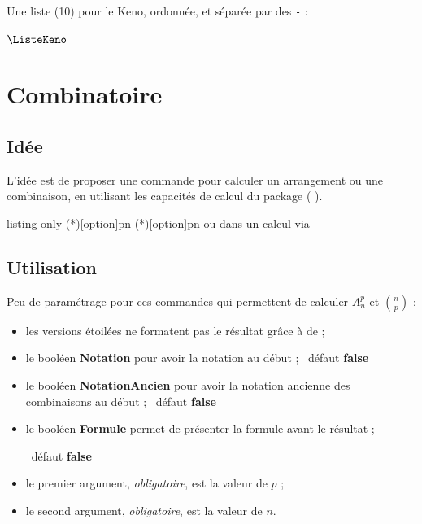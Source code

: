 \documentclass[a4paper,french,11pt]{article}
\newcommand\ctex[1]{\tcbox[vignettelatex]{#1}}
\newcommand\cmaj[1]{%
	{\tcbox[vignetteMaJ]{#1}\xspace}%
}
\newcommand\Cle[1]{{\bfseries\sffamily\textlangle #1\textrangle}}
\begin{document}
\begin{PresCodePL}{}
Une liste (10) pour le Keno\textcopyright, ordonnée, et séparée par des \texttt{-} :

\TirageAleatoireEntiers[ValMin=1,ValMax=70,NbVal=10,Tri=croissant,Sep={-}]{\ListeKeno}
$\ListeKeno$

\setsepchar{-}\readlist*\KENO{\ListeKeno}\showitems{\KENO}
\end{PresCodePL}

\newpage

\section{Combinatoire}\label{combinatoire}

\subsection{Idée}

\begin{tipblock}
L'idée est de proposer une commande pour calculer un arrangement ou une combinaison, en utilisant les capacités de calcul du package \ctex{xint} (\cmaj{2.5.4}).
\end{tipblock}

\begin{PresCodeTexPL}{listing only}
\Arrangement(*)[option]{p}{n}
\Combinaison(*)[option]{p}{n}
 ou  dans un calcul via 
\end{PresCodeTexPL}

\subsection{Utilisation}

\begin{cautionblock}
Peu de paramétrage pour ces commandes qui permettent de calculer $A_n^p$ et $\binom{n}{p}$ :

\begin{itemize}
	\item les versions étoilées ne formatent pas le résultat grâce à \ctex{\textbackslash num} de \ctex{sinuitx} ;
	\item le booléen \Cle{Notation} pour avoir la notation au début ; \hfill~défaut \Cle{false}
	\item le booléen \Cle{NotationAncien} pour avoir la notation \og ancienne \fg{} des combinaisons au début ; \hfill~défaut \Cle{false}
	\item le booléen \Cle{Formule} permet de présenter la formule avant le résultat ;
	
	\hfill~défaut \Cle{false}
	\item le premier argument, \textit{obligatoire}, est la valeur de $p$ ;
	\item le second argument, \textit{obligatoire}, est la valeur de $n$.
\end{itemize}
\vspace*{-\baselineskip}\leavevmode
\end{cautionblock}
\end{document}
